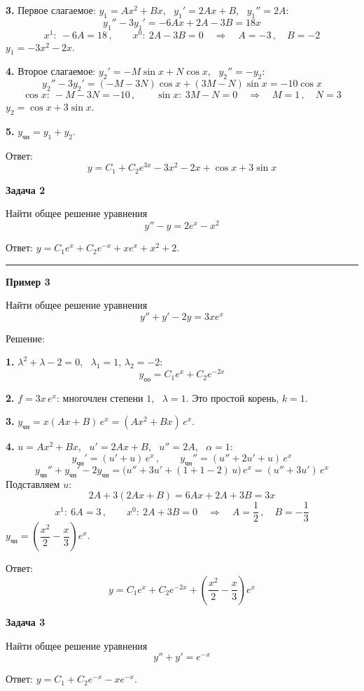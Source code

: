 \documentclass[11pt,a4paper]{article}
\newcommand{\example}[1]{\par\medskip\noindent\textbf{#1}\par\nopagebreak\smallskip}
\newcommand{\yoo}{y_{\text{оо}}}
\newcommand{\ych}{y_{\text{чн}}}
\begin{document}
\textbf{3.} Первое слагаемое: $y_1 = Ax^2 + Bx$, \ $y_1' = 2Ax + B$, \ $y_1'' = 2A$:
\[
  y_1'' - 3y_1' = -6Ax + 2A - 3B = 18x
\]
\[
  x^1:\ -6A = 18\,, \qquad x^0:\ 2A - 3B = 0
  \quad\Rightarrow\quad
  A = -3\,, \quad B = -2
\]
$y_1 = -3x^2 - 2x$.

\textbf{4.} Второе слагаемое: $y_2' = -M\sin x + N\cos x$, \ $y_2'' = -y_2$:
\[
  y_2'' - 3y_2' = (-M - 3N)\cos x + (3M - N)\sin x = -10\cos x
\]
\[
  \cos x:\ -M - 3N = -10\,, \qquad \sin x:\ 3M - N = 0
  \quad\Rightarrow\quad
  M = 1\,, \quad N = 3
\]
$y_2 = \cos x + 3\sin x$.

\textbf{5.} $\ych = y_1 + y_2$.

Ответ:
\[
  y = C_1 + C_2 e^{3x} - 3x^2 - 2x + \cos x + 3\sin x
\]

\example{Задача 2}

Найти общее решение уравнения
\[
  y'' - y = 2e^{x} - x^2
\]

Ответ: $y = C_1 e^{x} + C_2 e^{-x} + x e^{x} + x^2 + 2$.

\medskip\hrule\medskip

\example{Пример 3}

Найти общее решение уравнения
\[
  y'' + y' - 2y = 3x e^{x}
\]

Решение:

\textbf{1.} $\lambda^2 + \lambda - 2 = 0$, \ $\lambda_1 = 1$, $\lambda_2 = -2$:
\[
  \yoo = C_1 e^{x} + C_2 e^{-2x}
\]

\textbf{2.} $f = 3x\, e^{x}$: многочлен степени $1$, \ $\lambda = 1$. Это простой корень, $k = 1$.

\textbf{3.} $\ych = x(Ax + B)\, e^{x} = (Ax^2 + Bx)\, e^{x}$.

\textbf{4.} $u = Ax^2 + Bx$, \ $u' = 2Ax + B$, \ $u'' = 2A$, \ $\alpha = 1$:
\[
  \ych' = (u' + u)\, e^{x}\,, \qquad \ych'' = (u'' + 2u' + u)\, e^{x}
\]
\[
  \ych'' + \ych' - 2\ych = \bigl(u'' + 3u' + (1 + 1 - 2)\,u\bigr)\, e^{x} = (u'' + 3u')\, e^{x}
\]
Подставляем $u$:
\[
  2A + 3(2Ax + B) = 6Ax + 2A + 3B = 3x
\]
\[
  x^1:\ 6A = 3\,, \qquad x^0:\ 2A + 3B = 0
  \quad\Rightarrow\quad
  A = \frac12\,, \quad B = -\frac13
\]
$\ych = \left(\dfrac{x^2}{2} - \dfrac{x}{3}\right) e^{x}$.

Ответ:
\[
  y = C_1 e^{x} + C_2 e^{-2x} + \left(\frac{x^2}{2} - \frac{x}{3}\right) e^{x}
\]

\example{Задача 3}

Найти общее решение уравнения
\[
  y'' + y' = e^{-x}
\]

Ответ: $y = C_1 + C_2 e^{-x} - x e^{-x}$.
\end{document}

